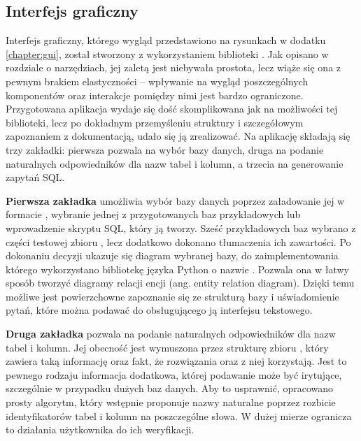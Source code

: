 \subsection{Interfejs graficzny}
Interfejs graficzny, którego wygląd przedstawiono na rysunkach w dodatku \ref{chapter:gui}, został stworzony z wykorzystaniem biblioteki . Jak opisano w rozdziale o narzędziach, jej zaletą jest niebywała prostota, lecz wiąże się ona z pewnym brakiem elastyczności -- wpływanie na wygląd poszczególnych komponentów oraz interakcje pomiędzy nimi jest bardzo ograniczone. Przygotowana aplikacja wydaje się dość skomplikowana jak na możliwości tej biblioteki, lecz po dokładnym przemyśleniu struktury i szczegółowym zapoznaniem z dokumentacją, udało się ją zrealizować. Na aplikację składają się trzy zakładki: pierwsza pozwala na wybór bazy danych, druga na podanie naturalnych odpowiedników dla nazw tabel i kolumn, a trzecia na generowanie zapytań SQL.

\textbf{Pierwsza zakładka} umożliwia wybór bazy danych poprzez załadowanie jej w formacie , wybranie jednej z przygotowanych baz przykładowych lub wprowadzenie skryptu SQL, który ją tworzy. Sześć przykładowych baz wybrano z części testowej zbioru , lecz dodatkowo dokonano tłumaczenia ich zawartości. Po dokonaniu decyzji ukazuje się diagram wybranej bazy, do zaimplementowania którego wykorzystano bibliotekę języka Python o nazwie . Pozwala ona w łatwy sposób tworzyć diagramy relacji encji (ang. entity relation diagram). Dzięki temu możliwe jest powierzchowne zapoznanie się ze strukturą bazy i uświadomienie pytań, które można podawać do obsługującego ją interfejsu tekstowego.

\textbf{Druga zakładka} pozwala na podanie naturalnych odpowiedników dla nazw tabel i kolumn. Jej obecność jest wymuszona przez strukturę zbioru , który zawiera taką informację oraz fakt, że rozwiązania  oraz  z niej korzystają. Jest to pewnego rodzaju informacja dodatkowa, której podawanie może być irytujące, szczególnie w przypadku dużych baz danych. Aby to usprawnić, opracowano prosty algorytm, który wstępnie proponuje nazwy naturalne poprzez rozbicie identyfikatorów tabel i kolumn na poszczególne słowa. W dużej mierze ogranicza to działania użytkownika do ich weryfikacji.

